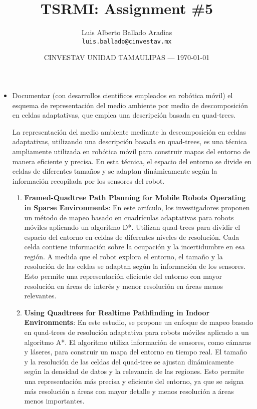 \documentclass{article}
\title{TSRMI: Assignment \#5} %
\author{Luis Alberto Ballado Aradias\\ \texttt{luis.ballado@cinvestav.mx}} %
\date{CINVESTAV UNIDAD TAMAULIPAS --- \today} %
\begin{document}
\maketitle %


\begin{itemize} %
\item Documentar (con desarrollos cientificos empleados en robótica móvil) el esquema de representación del medio ambiente por medio de descomposición en celdas adaptativas, que emplea una descripción basada en quad-trees.

  La representación del medio ambiente mediante la descomposición en celdas adaptativas, utilizando una descripción basada en quad-trees, es una técnica ampliamente utilizada en robótica móvil para construir mapas del entorno de manera eficiente y precisa. En esta técnica, el espacio del entorno se divide en celdas de diferentes tamaños y se adaptan dinámicamente según la información recopilada por los sensores del robot.

  \begin{enumerate}
  \item \textbf{Framed-Quadtree Path Planning for Mobile Robots Operating in Sparse Environments}: En este artículo, los investigadores proponen un método de mapeo basado en cuadrículas adaptativas para robots móviles aplicando un algoritmo D*. Utilizan quad-trees para dividir el espacio del entorno en celdas de diferentes niveles de resolución. Cada celda contiene información sobre la ocupación y la incertidumbre en esa región. A medida que el robot explora el entorno, el tamaño y la resolución de las celdas se adaptan según la información de los sensores. Esto permite una representación eficiente del entorno con mayor resolución en áreas de interés y menor resolución en áreas menos relevantes.
    
  \item \textbf{Using Quadtrees for Realtime Pathfinding in Indoor Environments}: En este estudio, se propone un enfoque de mapeo basado en quad-trees de resolución adaptativa para robots móviles aplicado a un algoritmo A*. El algoritmo utiliza información de sensores, como cámaras y láseres, para construir un mapa del entorno en tiempo real. El tamaño y la resolución de las celdas del quad-tree se ajustan dinámicamente según la densidad de datos y la relevancia de las regiones. Esto permite una representación más precisa y eficiente del entorno, ya que se asigna más resolución a áreas con mayor detalle y menos resolución a áreas menos importantes.
    

\end{enumerate}
\end{itemize}
\end{document}
